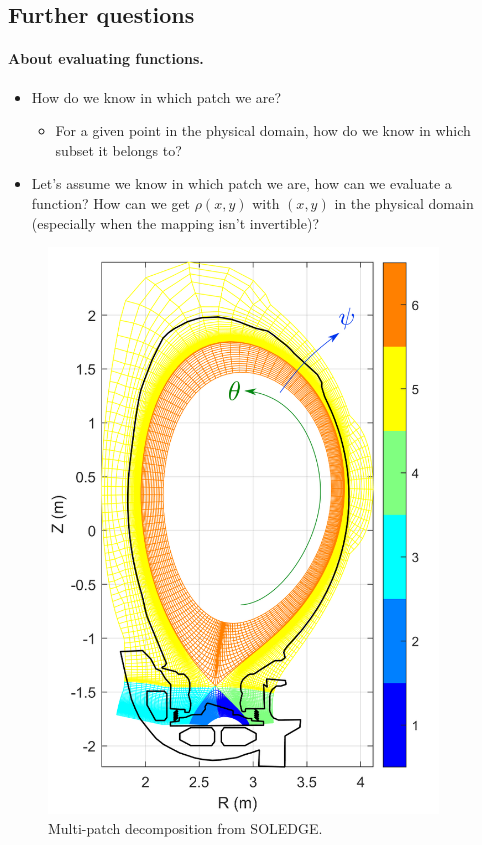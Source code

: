 \documentclass[presentation.tex]{subfiles}
\begin{document}
\subsection{Further questions}
\paragraph{About evaluating functions.}
\begin{itemize}
	\item How do we know in which patch we are?
	\begin{itemize}
		\item For a given point in the physical domain, how do we know in which subset it belongs to?
	\end{itemize}
	\item Let's assume we know in which patch we are, how can we evaluate a function? How can we get $\rho(x,y)$ with $(x,y)$ in the physical domain (especially when the mapping isn't invertible)?
\end{itemize}





\begin{figure}[!h]
\centering
	\includegraphics[height=15cm]{images/JET_zones2_SOLEDGE.png}
\caption{Multi-patch decomposition from SOLEDGE.}
\end{figure}

\newpage
\end{document}
